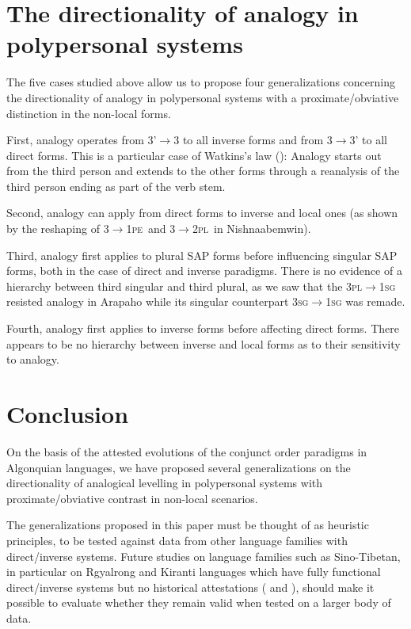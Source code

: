 \documentclass[twoside,a4paper,11pt]{article}
\newcommand{\sg}{\textsc{sg}}
\newcommand{\pl}{\textsc{pl}}
\newcommand{\Σ}{\greek{Σ}}
\newcommand{\pe}{\textsc{pe}}
\begin{document}
\section{The directionality of analogy in polypersonal systems}

The five cases studied above allow us to propose four generalizations concerning the directionality of analogy in polypersonal systems with a proximate/obviative distinction in the non-local forms.
 
First, analogy operates from 3'$\rightarrow$3 to all inverse forms and from 3$\rightarrow$3' to all direct forms. This is a particular case of   Watkins's law (\citealt{watkins62celtic}): Analogy starts out from the third person and extends to the other forms through a reanalysis of the third person ending as part of the verb stem.
 
Second, analogy can apply from direct forms to inverse and  local ones (as shown by the reshaping of 3$\rightarrow$1\pe\ and 3$\rightarrow$2\pl\ in Nishnaabemwin).

Third,  analogy first applies to plural SAP forms before influencing singular SAP forms, both in the case of direct and inverse paradigms. There is no evidence of a hierarchy between third singular and third plural, as we saw that the 3\pl{}$\rightarrow$1\sg{} resisted analogy in Arapaho while its singular counterpart 3\sg{}$\rightarrow$1\sg{} was remade.

Fourth, analogy first applies   to inverse forms before affecting direct forms. There appears  to be no hierarchy between inverse and local forms as to their sensitivity to analogy.


\section{Conclusion}

On the basis of the attested evolutions of the conjunct order paradigms in Algonquian languages, we have proposed several generalizations on the directionality of analogical levelling in polypersonal systems with proximate/obviative contrast in non-local scenarios. 

The generalizations proposed in this paper must be thought of as heuristic principles, to be tested against data from other language families with direct/inverse systems. Future studies on language families such as Sino-Tibetan, in particular on Rgyalrong and Kiranti languages which have fully functional direct/inverse systems but no historical attestations (\citealp{delancey81direction, jackson02rentongdengdi, gongxun14agreement} and \citealp{lai14person}), should make it possible to evaluate whether they remain valid when tested on a larger body of data.
\end{document}
